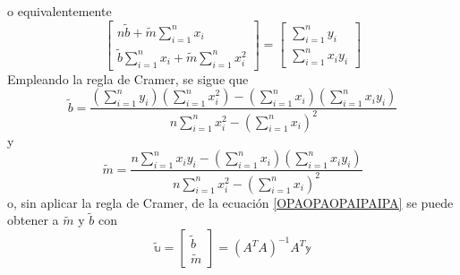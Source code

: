o equivalentemente
$$\begin{bmatrix}
    \displaystyle n\tilde{b} + \tilde{m} \sum_{i=1}^{n} x_i \\
    \displaystyle\tilde{b} \sum_{i=1}^{n} x_i + \tilde{m} \sum_{i=1}^{n} x_i^2
\end{bmatrix} = \begin{bmatrix}
    \displaystyle\sum_{i=1}^{n} y_i \\
    \displaystyle\sum_{i=1}^{n} x_iy_i
\end{bmatrix}$$
Empleando la regla de Cramer, se sigue que
$$\tilde{b} = \frac{\displaystyle\left( \sum_{i=1}^{n} y_i \right) \left( \sum_{i=1}^{n} x_i^2 \right) - \left( \sum_{i=1}^{n} x_i \right) \left( \sum_{i=1}^{n} x_iy_i \right)}{\displaystyle n \sum_{i=1}^{n} x_i^2 - \left( \sum_{i=1}^{n} x_i \right)^2}$$
y
$$\tilde{m} = \frac{\displaystyle n \sum_{i=1}^{n} x_iy_i - \left( \sum_{i=1}^{n} x_i \right) \left( \sum_{i=1}^{n} x_iy_i \right)}{\displaystyle n \sum_{i=1}^{n} x_i^2 - \left( \sum_{i=1}^{n} x_i \right)^2}$$
o, sin aplicar la regla de Cramer, de la ecuación \eqref{OPAOPAOPAIPAIPA} se puede obtener a $\tilde{m}$ y $\tilde{b}$ con
$$\tilde{\mathbb{u}} = \begin{bmatrix}
    \tilde{b} \\
    \tilde{m}
\end{bmatrix} = \left( A^T A \right)^{-1} A^T \mathbb{y}$$

